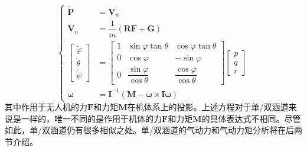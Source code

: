 \begin{equation}
\left\lbrace 
\begin{aligned}
\dot{\bm{P}} & = \bm{V}_n	\\
\dot{\bm{V}}_n & =\dfrac{1}{m}(\bm{R}\bm{F}+\bm{G})	\\
\begin{bmatrix}
\dot{\varphi} \\
\dot{\theta} \\
\dot{\psi}
\end{bmatrix} & =
\begin{bmatrix}
1 & \sin \varphi \tan \theta & \cos \varphi \tan \theta \\
0 & \cos \varphi & -\sin \varphi \\
0 & \dfrac{\sin \varphi}{\cos \theta} & \dfrac{\cos \varphi}{\cos \theta}
\end{bmatrix}
\begin{bmatrix}
p \\
q \\
r
\end{bmatrix}	\\
\dot{\bm{\omega}} & = \bm{I}^{-1}(\bm{M}-\bm{\omega} \times \bm{I} \bm{\omega})
\end{aligned}
\right. 		\label{eq_nonlinear_model}
\end{equation}
其中作用于无人机的力$ \bm{F} $和力矩$ \bm{M} $在机体系上的投影。上述方程对于单/双涵道来说是一样的，唯一不同的是作用于机体的力$ \bm{F} $和力矩$ \bm{M} $的具体表达式不相同。尽管如此，单/双涵道仍有很多相似之处。单/双涵道的气动力和气动力矩分析将在后两节介绍。

